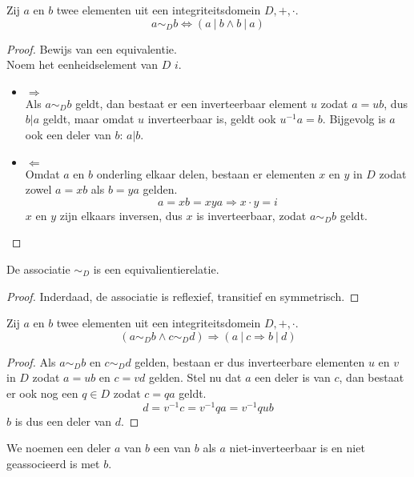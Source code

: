 \documentclass[main.tex]{subfiles}
\begin{document}
\begin{st}
  Zij $a$ en $b$ twee elementen uit een integriteitsdomein $D,+,\cdot$.
  \[ a \sim_{D} b \Leftrightarrow (a\ |\ b \wedge b\ |\ a) \]

  \begin{proof}
    Bewijs van een equivalentie.\\
    Noem het eenheidselement van $D$ $i$.
    \begin{itemize}
    \item $\Rightarrow$\\
      Als $a\sim_{D} b$ geldt, dan bestaat er een inverteerbaar element $u$ zodat $a= ub$, dus $b|a$ geldt, maar omdat $u$ inverteerbaar is, geldt ook $u^{-1}a=b$.
      Bijgevolg is $a$ ook een deler van $b$: $a|b$.
    \item $\Leftarrow$\\
      Omdat $a$ en $b$ onderling elkaar delen, bestaan er elementen $x$ en $y$ in $D$ zodat zowel $a=xb$ als $b=ya$ gelden.
      \[ a = xb = xya \Rightarrow x\cdot y = i\]
      $x$ en $y$ zijn elkaars inversen, dus $x$ is inverteerbaar, zodat $a\sim_{D} b$ geldt.
    \end{itemize}
  \end{proof}
\end{st}

\begin{ei}
  \label{ei:associatie-is-equivalentierelatie}
  De associatie $\sim_{D}$ is een equivalientierelatie.
  \begin{proof}
    Inderdaad, de associatie is reflexief, transitief en symmetrisch.
  \end{proof}
\end{ei}

\begin{st}
  Zij $a$ en $b$ twee elementen uit een integriteitsdomein $D,+,\cdot$.
  \[ (a \sim_{D} b \wedge c \sim_{D} d) \Rightarrow (a\ |\ c \Rightarrow b\ |\ d) \]

  \begin{proof}
    Als $a\sim_{D} b$ en $c\sim_{D} d$ gelden, bestaan er dus inverteerbare elementen $u$ en $v$ in $D$ zodat $a=ub$ en $c=vd$ gelden.
    Stel nu dat $a$ een deler is van $c$, dan bestaat er ook nog een $q\in D$ zodat $c=qa$ geldt.
    \[ d = v^{-1}c = v^{-1}qa = v^{-1}qub \]
    $b$ is dus een deler van $d$.
  \end{proof}
\end{st}

\begin{de}
  We noemen een deler $a$ van $b$ een  van $b$ als $a$ niet-inverteerbaar is en niet geassocieerd is met $b$.
\end{de}
\end{document}
